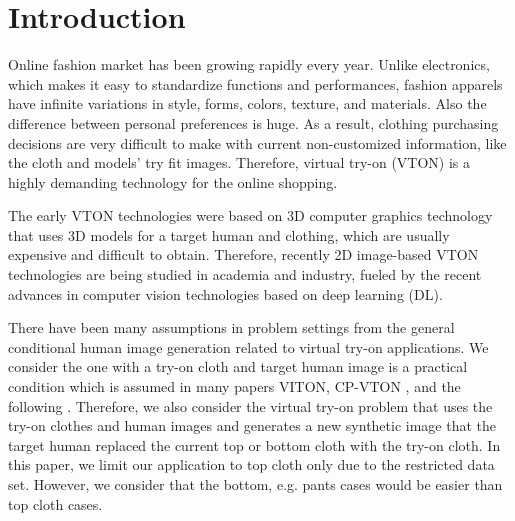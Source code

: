 \section{Introduction} \label{section:intro}


Online fashion market has been growing rapidly every year. Unlike electronics, which makes it easy to standardize functions and performances, fashion apparels have infinite variations in style, forms, colors, texture, and materials.  Also the difference between personal preferences is huge. As a result, clothing purchasing decisions are very difficult to make with current non-customized information, like the cloth and models' try fit images. Therefore, virtual try-on (VTON) is a highly demanding technology for the online shopping. 

The early VTON technologies were based on 3D computer graphics technology that uses 3D models for a target human and clothing, which are usually expensive and difficult to obtain. Therefore, recently 2D image-based VTON technologies are being studied in academia and industry, fueled by the recent advances in computer vision technologies based on deep learning (DL). 

There have been many assumptions in problem settings from the general conditional human image generation related to virtual try-on applications. We consider the one with a try-on cloth and target human image is a practical condition which is assumed in many papers VITON\cite{Han2017VITONAI}, CP-VTON\cite{Wang2018TowardCI} , and the following  \cite{Sun2019ImageBasedVT,Yu_2019_ICCV}. Therefore, we also consider the virtual try-on problem that uses the try-on clothes and human images and generates a new synthetic image that the target human replaced the current top or bottom cloth with the try-on cloth. In this paper, we limit our application to top cloth only due to the restricted data set. However, we consider that the bottom, e.g. pants cases would be easier than top cloth cases.



